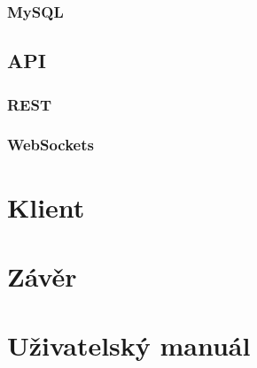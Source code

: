 \documentclass[czech,BP]{thesiskiv}
\begin{document}
			\subsection{MySQL}
	
		\section{API}
			\subsection{REST}
		
			\subsection{WebSockets}	
	
\chapter{Klient}



\chapter{Závěr}


{\raggedright\small

}

\chapter*{Uživatelský manuál}
\end{document}
